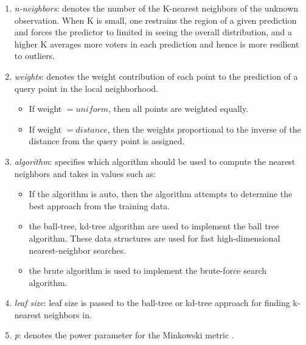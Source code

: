 \begin{enumerate}

\item \textit{n-neighbors}: denotes the number of the  K-nearest neighbors of the unknown observation. When K is small, one restrains the region of a given prediction and forces the predictor to limited in seeing the overall distribution, and a higher K averages more voters in each prediction and hence is more resilient to outliers.  
\item \textit{weights}: denotes the weight contribution of each point to the prediction of a query point in the local neighborhood.  
\begin{itemize}

\item If weight $=uniform$, then all points are weighted  equally.
\item If weight $=distance$, then the weights proportional to the inverse of the distance from the query point is assigned.  
\end{itemize}
\item \textit{algorithm}: specifies which algorithm  should be used to compute the nearest neighbors and takes in values such as:
\begin{itemize}

\item If the algorithm is auto, then the algorithm attempts to determine the best approach from the training data.

\item the ball-tree, kd-tree algorithm are used to implement the ball tree algorithm. These data structures are used for fast high-dimensional nearest-neighbor searches.  
\item the brute algorithm is used to implement the brute-force search algorithm. 
\end{itemize}
\item \textit{leaf size}: leaf size is passed to the ball-tree or kd-tree approach for finding k-nearest neighbors in.

\item \textit{p}: denotes the power parameter for the Minkowski metric \citep{pedregosa2011scikit}.
\end{enumerate}


